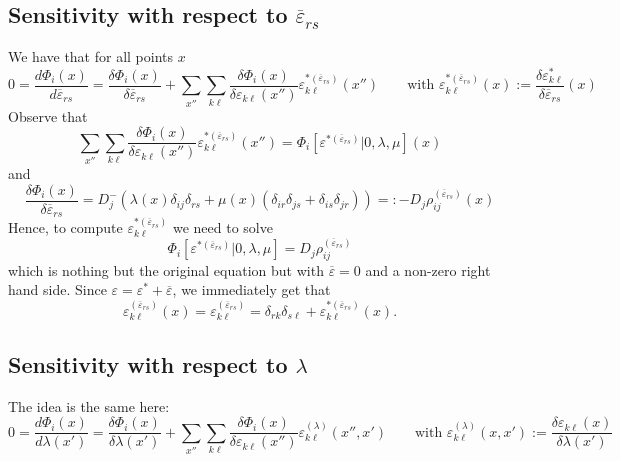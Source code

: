 \documentclass[11pt]{article}
\begin{document}
\subsection{Sensitivity with respect to $\overline{\varepsilon}_{rs}$}
We have that for all points $x$
\begin{equation}
0 = \frac{d\Phi_i(x)}{d\overline{\varepsilon}_{rs}} = \frac{\delta \Phi_i(x)}{\delta \overline{\varepsilon}_{rs}} + \sum_{x''}\sum_{k\ell} \frac{\delta \Phi_i(x)}{\delta \varepsilon_{k\ell}(x'')} \varepsilon^{*(\overline{\varepsilon}_{rs})}_{k\ell}(x'')\qquad\text{with $\varepsilon^{*(\overline{\varepsilon}_{rs})}_{k\ell}(x) := \frac{\delta \varepsilon^*_{k\ell}}{\delta \overline{\varepsilon}_{rs}}(x)$}
\end{equation}
Observe that
\begin{equation}
\sum_{x''}\sum_{k\ell}\frac{\delta \Phi_i(x)}{\delta \varepsilon_{k\ell}(x'')} \varepsilon^{*(\overline{\varepsilon}_{rs})}_{k\ell}(x'') = \Phi_i \left[\varepsilon^{*(\overline{\varepsilon}_{rs})}|0,\lambda,\mu\right](x)
\end{equation}
and
\begin{equation}
\frac{\delta \Phi_i(x)}{\delta \overline{\varepsilon}_{rs}} = D_j^-\left(\lambda(x)\delta_{ij}\delta_{rs} + \mu(x) (\delta_{ir}\delta_{js}+\delta_{is}\delta_{jr})\right) =: -D_j \rho_{ij}^{(\overline{\varepsilon}_{rs})}(x)
\end{equation}
Hence, to compute $\varepsilon^{*(\overline{\varepsilon}_{rs})}_{k\ell}$ we need to solve
\begin{equation}
    \Phi_i \left[\varepsilon^{*(\overline{\varepsilon}_{rs})}|0,\lambda,\mu\right] = D_j\rho_{ij}^{(\overline{\varepsilon}_{rs})}
\end{equation}
which is nothing but the original equation but with $\overline{\varepsilon}=0$ and a non-zero right hand side. Since $\varepsilon=\varepsilon^*+\overline{\varepsilon}$, we immediately get that
\begin{equation}
\varepsilon^{(\overline{\varepsilon}_{rs})}_{k\ell}(x) = \varepsilon^{(\overline{\varepsilon}_{rs})}_{k\ell} = \delta_{rk}\delta_{s\ell} + \varepsilon^{*(\overline{\varepsilon}_{rs})}_{k\ell}(x).
\end{equation}
\subsection{Sensitivity with respect to $\lambda$}
The idea is the same here:
\begin{equation}
0 = \frac{d\Phi_i(x)}{d\lambda(x')} = \frac{\delta \Phi_i(x)}{\delta \lambda(x')} + \sum_{x''}\sum_{k\ell} \frac{\delta \Phi_i(x)}{\delta \varepsilon_{k\ell}(x'')} \varepsilon^{(\lambda)}_{k\ell}(x'',x')\qquad\text{with $\varepsilon^{(\lambda)}_{k\ell}(x,x') := \frac{\delta \varepsilon_{k\ell}(x)}{\delta \lambda(x')}$}
\end{equation}



\end{document}
